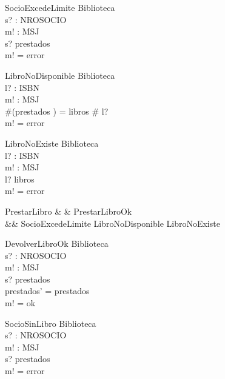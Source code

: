\documentclass{article}
\begin{document}
\begin{schema}{SocioExcedeLimite}
\Xi Biblioteca \\
s? : NROSOCIO \\
m! : MSJ \\
\where
s? \in \dom prestados \\
m! = error \\
\end{schema}

\begin{schema}{LibroNoDisponible}
\Xi Biblioteca \\
l? : ISBN \\ 
m! : MSJ \\
\where
\#(prestados \rres {}) = libros \# l? \\
m! = error \\
\end{schema}

\begin{schema}{LibroNoExiste}
\Xi Biblioteca \\
l? : ISBN \\ 
m! : MSJ \\
\where
l? \notin \dom libros \\
m! = error \\
\end{schema}

\begin{syntax}
PrestarLibro &  & PrestarLibroOk \lor \\
&& SocioExcedeLimite \lor LibroNoDisponible \lor LibroNoExiste \\
\end{syntax}

\begin{schema}{DevolverLibroOk}
\Delta Biblioteca \\
s? : NROSOCIO \\
m! : MSJ \\
\where
s? \in \dom prestados \\
prestados' = prestados \dares {} \\
m! = ok \\
\end{schema}

\begin{schema}{SocioSinLibro}
\Xi Biblioteca \\
s? : NROSOCIO \\
m! : MSJ \\
\where
s? \notin \dom prestados \\
m! = error \\
\end{schema}
\end{document}
